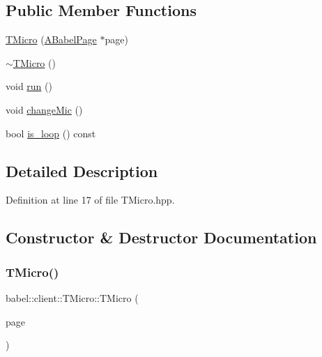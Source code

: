\subsection*{Public Member Functions}
\begin{DoxyCompactItemize}
\item 
\mbox{\hyperlink{classbabel_1_1client_1_1_t_micro_a5f296ce21c811f643e3ad99da0d0761d}{T\+Micro}} (\mbox{\hyperlink{classbabel_1_1client_1_1_a_babel_page}{A\+Babel\+Page}} $\ast$page)
\item 
\mbox{\hyperlink{classbabel_1_1client_1_1_t_micro_a710f29833224512c0ed9a6c8503269f5}{$\sim$\+T\+Micro}} ()
\item 
void \mbox{\hyperlink{classbabel_1_1client_1_1_t_micro_acd6ca738c80803e43bb5868d6bb2a577}{run}} ()
\item 
void \mbox{\hyperlink{classbabel_1_1client_1_1_t_micro_aaf001f7264baf8b843088e44a12b6140}{change\+Mic}} ()
\item 
bool \mbox{\hyperlink{classbabel_1_1client_1_1_t_micro_adb2141d5ede397e02e8c2ff966856801}{is\+\_\+loop}} () const
\end{DoxyCompactItemize}


\subsection{Detailed Description}


Definition at line 17 of file T\+Micro.\+hpp.



\subsection{Constructor \& Destructor Documentation}
\mbox{\label{classbabel_1_1client_1_1_t_micro_a5f296ce21c811f643e3ad99da0d0761d}} 
\subsubsection{\texorpdfstring{T\+Micro()}{TMicro()}}
{\footnotesize\ttfamily babel\+::client\+::\+T\+Micro\+::\+T\+Micro (\begin{DoxyParamCaption}\item[{\mbox{\hyperlink{classbabel_1_1client_1_1_a_babel_page}{A\+Babel\+Page}} $\ast$}]{page }\end{DoxyParamCaption})}



